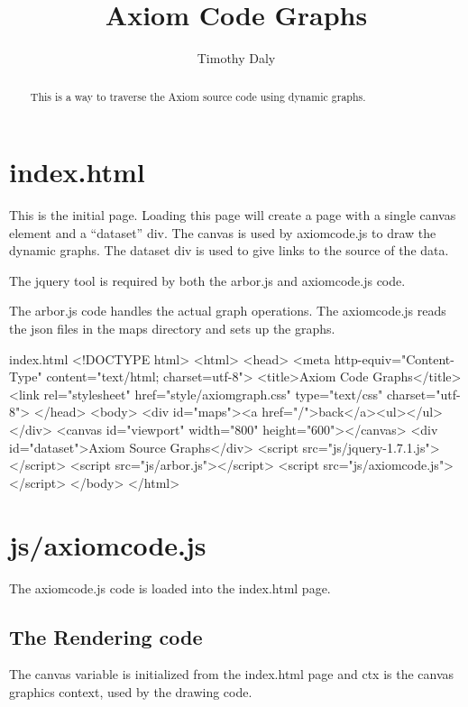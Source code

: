 \documentclass{article}
\begin{document}
\title{Axiom Code Graphs}
\author{Timothy Daly}
\maketitle
\begin{abstract}
This is a way to traverse the Axiom source code using dynamic graphs.
\end{abstract}
\newpage
\tableofcontents
\newpage
\section{index.html}
This is the initial page. Loading this page will create a page with a
single canvas element and a ``dataset'' div. The canvas is used by
axiomcode.js to draw the dynamic graphs. The dataset div is used to
give links to the source of the data.

The jquery tool is required by both the arbor.js and axiomcode.js code.

The arbor.js code handles the actual graph operations. The axiomcode.js
reads the json files in the maps directory and sets up the graphs.
\begin{chunk}{index.html}
<!DOCTYPE html>
<html>
 <head>
  <meta http-equiv="Content-Type" content="text/html; charset=utf-8">
  <title>Axiom Code Graphs</title>
  <link rel="stylesheet" href="style/axiomgraph.css" 
        type="text/css" charset="utf-8">
 </head>
 <body>
  <div id="maps"><a href="/">back</a><ul></ul></div>
  <canvas id="viewport" width="800" height="600"></canvas>
  <div id="dataset">Axiom Source Graphs</div>
  <script src="js/jquery-1.7.1.js"></script>
  <script src="js/arbor.js"></script>
  <script src="js/axiomcode.js"></script>
 </body>
</html>
\end{chunk}

\section{js/axiomcode.js}
The axiomcode.js code is loaded into the index.html page.

\subsection{The Rendering code}
The canvas variable is initialized from the index.html page and ctx is the
canvas graphics context, used by the drawing code.
\end{document}
